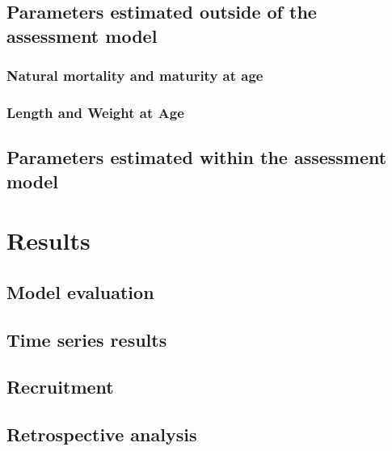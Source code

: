 \documentclass[11pt,]{article}
\begin{document}
\hypertarget{parameters-estimated-outside-of-the-assessment-model}{%
\subsection{Parameters estimated outside of the assessment
model}\label{parameters-estimated-outside-of-the-assessment-model}}

\hypertarget{natural-mortality-and-maturity-at-age}{%
\subsubsection{Natural mortality and maturity at
age}\label{natural-mortality-and-maturity-at-age}}

\hypertarget{length-and-weight-at-age}{%
\subsubsection{Length and Weight at
Age}\label{length-and-weight-at-age}}

\hypertarget{parameters-estimated-within-the-assessment-model}{%
\subsection{Parameters estimated within the assessment
model}\label{parameters-estimated-within-the-assessment-model}}

\hypertarget{results}{%
\section{Results}\label{results}}

\hypertarget{model-evaluation}{%
\subsection{Model evaluation}\label{model-evaluation}}

\hypertarget{time-series-results}{%
\subsection{Time series results}\label{time-series-results}}

\hypertarget{recruitment}{%
\subsection{Recruitment}\label{recruitment}}

\hypertarget{retrospective-analysis}{%
\subsection{Retrospective analysis}\label{retrospective-analysis}}
\end{document}

